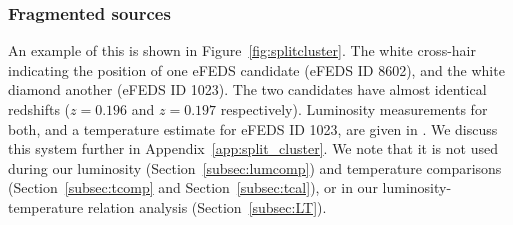 \documentclass[fleqn,usenatbib]{mnras}
\begin{document}



\subsubsection{Fragmented sources}
\label{subsubsec:frag}

An example of this is shown in Figure~\ref{fig:splitcluster}. The white cross-hair indicating the position of one eFEDS candidate (eFEDS ID 8602), and the white diamond another (eFEDS ID 1023). The two candidates have almost identical redshifts ($z{=}0.196$ and $z{=}0.197$ respectively). Luminosity measurements for both, and a temperature estimate for eFEDS ID 1023, are given in \cite{efedsclustercat}. We discuss this system further in Appendix~\ref{app:split_cluster}. We note that it is not used during our luminosity (Section~\ref{subsec:lumcomp}) and temperature comparisons (Section~\ref{subsec:tcomp} and Section~\ref{subsec:tcal}), or in our luminosity-temperature relation analysis (Section~\ref{subsec:LT}).


\end{document}
